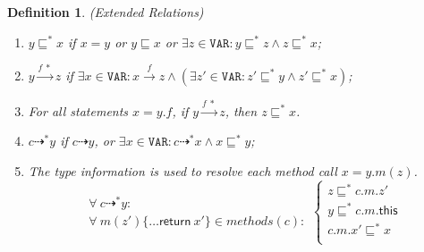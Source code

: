 \documentclass{fac}
\newcommand\eg{\textit{e.g.\ }}
\newtheorem{Definition}{Definition}
\newcommand{\keyword}[1]{\mathsf{#1}}
\newcommand{\kw}[1]{\keyword{#1}}
\newcommand\Var{\mathtt{VAR}}
\newcommand{\less}{\sqsubseteq}
\newcommand{\tflow}{\dashrightarrow}
\newcommand{\hflow}{\longrightarrow}
\newcommand{\lhflow}[1]{\stackrel{#1}{\hflow}}
\begin{document}
\begin{Definition}\label{def:extension} (Extended Relations)
\begin{enumerate}
\item $y\less^* x$ if $x=y$ or $y\less x$ or $\exists z\in\Var:y\less^* z\wedge z\less^* x$;


\item $y\lhflow{f\ *}z$ if $\exists x\in\Var: x\lhflow{f}z\wedge (\exists z'\in\Var: z'\less^* y \wedge z'\less^*x)$;


\item For all statements $x = y.f $, if $y\lhflow{f\ *}z$, then $z\less^* x$.


\item $c\tflow^* y$ if $c\tflow y$, or $\exists x\in\Var:c\tflow^* x\wedge x\less^* y$;


\item The type information is used to resolve each method call $x = y.m(z)$.
  \begin{equation*}
  \left.\begin{array}{l}\forall\ c\tflow^* y:\\ \forall\ m(z')\{\dots \kw{return}\ x'\}\in methods(c):\end{array}\right.\left\{\begin{array}{l}
        z\less^* c.m.z'\\
        y\less^* c.m.\keyword{this}\\
        c.m.x'\less^* x \\
        \end{array}\right.
  \end{equation*}
\end{enumerate}
\end{Definition}
\end{document}
